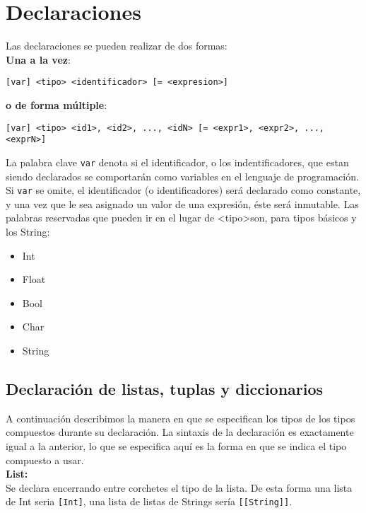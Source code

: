 \documentclass[12pt, spanish]{report}
\begin{document}
\chapter{Declaraciones}
\label{sec:decl}

Las declaraciones se pueden realizar de dos formas:\\

\textbf{Una a la vez}:
\begin{verbatim}
[var] <tipo> <identificador> [= <expresion>]
\end{verbatim}

\textbf{o de forma m\'ultiple}:
\begin{verbatim}
[var] <tipo> <id1>, <id2>, ..., <idN> [= <expr1>, <expr2>, ..., <exprN>]
\end{verbatim}

La palabra clave \texttt{var} denota si el identificador, o los
indentificadores, que estan siendo declarados se comportar\'an como
variables en el lenguaje de programaci\'on. Si \texttt{var} se omite,
el identificador (o identificadores) ser\'a declarado como constante,
y una vez que le sea asignado un valor de una expresi\'on, \'este
ser\'a inmutable. Las palabras reservadas que pueden ir en el lugar de
\textless tipo\textgreater son, para tipos b\'asicos y los String:

\begin{itemize}
\item Int
\item Float
\item Bool
\item Char
\item String
\end{itemize}

\section{Declaraci\'on de listas, tuplas y diccionarios}
\label{sec:declc}
A continuaci\'on describimos la manera en que se especifican los tipos
de los tipos compuestos durante su declaraci\'on. La sintaxis de la
declaraci\'on es exactamente igual a la anterior, lo que se especifica
aqu\'i es la forma en que se indica el tipo compuesto a usar.\\

\textbf{List:}\\
Se declara encerrando entre corchetes el tipo de la
lista. De esta forma una lista de Int seria \texttt{[Int]}, una lista
de listas de Strings ser\'ia \texttt{[[String]]}.\\
\end{document}
